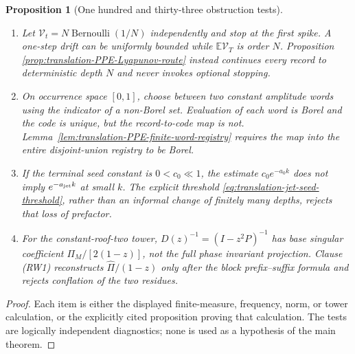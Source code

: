 \documentclass[11pt]{article}
\newtheorem{proposition}[theorem]{Proposition}
\begin{document}
\begin{proposition}[One hundred and thirty-three obstruction tests]
\begin{enumerate}[label=\textup{(T\arabic*)}]
      assign an unrecorded recovery/homogeneity cost $Z_N=N$.  The inverse
      length stays one while
      $\mathbb E[\mathscr WZ_N^\chi]=N^\chi$.  The full-mark requirement in
      \eqref{eq:cellwise-regularity-inputs} rejects inference of hereditary
      $Z$ from inverse length alone.
\item Let $\mathcal V_t=N\operatorname{Bernoulli}(1/N)$ independently and
      stop at the first spike.  A one-step drift can be uniformly bounded
      while $\mathbb E\mathcal V_T$ is order $N$.  Proposition~
      \ref{prop:translation-PPE-Lyapunov-route} instead continues every
      record to deterministic depth $N$ and never invokes optional stopping.
\item On occurrence space $[0,1]$, choose between two constant amplitude
      words using the indicator of a non-Borel set.  Evaluation of each word
      is Borel and the code is unique, but the record-to-code map is not.
      Lemma~\ref{lem:translation-PPE-finite-word-registry} requires the map
      into the entire disjoint-union registry to be Borel.
\item If the terminal seed constant is $0<c_0\ll1$, the estimate
      $c_0e^{-a_0k}$ does not imply $e^{-a_{\rm jet}k}$ at small $k$.
      The explicit threshold
      \eqref{eq:translation-jet-seed-threshold}, rather than an informal
      change of finitely many depths, rejects that loss of prefactor.
\item For the constant-roof-two tower,
      $D(z)^{-1}=(I-z^2P)^{-1}$ has base singular coefficient
      $\Pi_M/[2(1-z)]$, not the full phase invariant projection.  Clause
      \textup{(RW1)} reconstructs $\widehat\Pi/(1-z)$ only after the block
      prefix--suffix formula and rejects conflation of the two residues.
\end{enumerate}
\end{proposition}

\begin{proof}
Each item is either the displayed finite-measure, frequency, norm, or tower
calculation, or the explicitly cited proposition proving that calculation.
The tests are logically independent diagnostics; none is used as a
hypothesis of the main theorem.
\end{proof}
\end{document}
